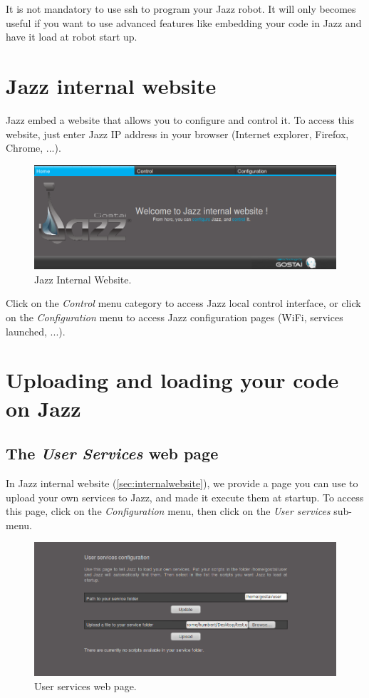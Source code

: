 It is not mandatory to use ssh to program your Jazz robot. It will only
becomes useful if you want to use advanced features like embedding your
code in Jazz and have it load at robot start up.

\section{Jazz internal website}
\label{sec:internalwebsite}

Jazz embed a website that allows you to configure and control it. To access this website, just enter
Jazz IP address in your browser (Internet explorer, Firefox, Chrome, ...).

\begin{figure}[!h]
  \centering
  \includegraphics[width=.7\linewidth]{img/jazz/internalsite}
  \caption{Jazz Internal Website.}
  \label{fig:jazz:internalwebsite}
\end{figure}

Click on the \textit{Control} menu category to access Jazz local control
interface, or click on the \textit{Configuration} menu to access Jazz
configuration pages (WiFi, services launched, ...).

\section{Uploading and loading your code on Jazz}

\subsection{The \textit{User Services} web page}

In Jazz internal website (\autoref{sec:internalwebsite}), we provide a page
you can use to upload your own \us services to Jazz, and made it execute
them at startup. To access this page, click on the \textit{Configuration}
menu, then click on the \textit{User services} sub-menu.

\begin{figure}[!h]
  \centering
  \includegraphics[width=.7\linewidth]{img/jazz/userservices1}
  \caption{User services web page.}
  \label{fig:jazz:userservice1}
\end{figure}

